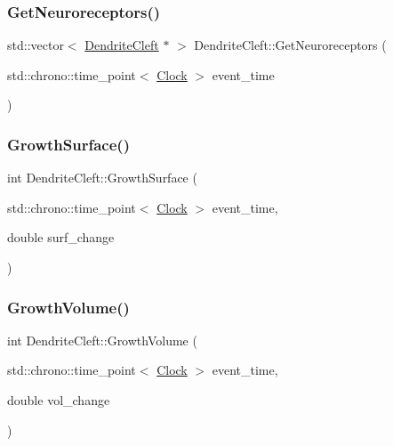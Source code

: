 \mbox{\label{classDendriteCleft_a4a14361574777fb1d66fd4ed2d4f2492}} 
\subsubsection{\texorpdfstring{Get\+Neuroreceptors()}{GetNeuroreceptors()}}
{\footnotesize\ttfamily std\+::vector$<$ \mbox{\hyperlink{classDendriteCleft}{Dendrite\+Cleft}} $\ast$ $>$ Dendrite\+Cleft\+::\+Get\+Neuroreceptors (\begin{DoxyParamCaption}\item[{std\+::chrono\+::time\+\_\+point$<$ \mbox{\hyperlink{universe_8h_a0ef8d951d1ca5ab3cfaf7ab4c7a6fd80}{Clock}} $>$}]{event\+\_\+time }\end{DoxyParamCaption})}

\mbox{\label{classDendriteCleft_af4715ffbf1bf437523d07e37b7abc3e0}} 
\subsubsection{\texorpdfstring{Growth\+Surface()}{GrowthSurface()}}
{\footnotesize\ttfamily int Dendrite\+Cleft\+::\+Growth\+Surface (\begin{DoxyParamCaption}\item[{std\+::chrono\+::time\+\_\+point$<$ \mbox{\hyperlink{universe_8h_a0ef8d951d1ca5ab3cfaf7ab4c7a6fd80}{Clock}} $>$}]{event\+\_\+time,  }\item[{double}]{surf\+\_\+change }\end{DoxyParamCaption})}

\mbox{\label{classDendriteCleft_a0cb2fc6ad72bba55b5f65130006d4b12}} 
\subsubsection{\texorpdfstring{Growth\+Volume()}{GrowthVolume()}}
{\footnotesize\ttfamily int Dendrite\+Cleft\+::\+Growth\+Volume (\begin{DoxyParamCaption}\item[{std\+::chrono\+::time\+\_\+point$<$ \mbox{\hyperlink{universe_8h_a0ef8d951d1ca5ab3cfaf7ab4c7a6fd80}{Clock}} $>$}]{event\+\_\+time,  }\item[{double}]{vol\+\_\+change }\end{DoxyParamCaption})}

